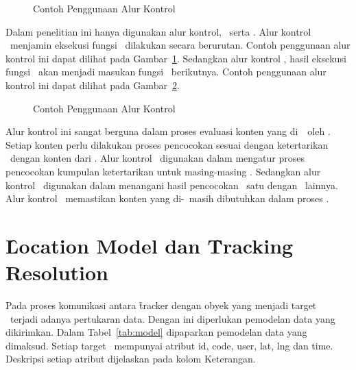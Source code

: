 \noindent
\begin{figure}
	\centering
	\lstset{basicstyle=\footnotesize\ttfamily,frame=single,language=javascript}
	
	\caption{Contoh Penggunaan Alur Kontrol \series}
\label{fig:async_series}
\end{figure}

Dalam penelitian ini hanya digunakan alur kontrol, \series~serta \waterfall.
Alur kontrol \series~menjamin eksekusi fungsi \anonymous~dilakukan secara
berurutan. Contoh penggunaan alur kontrol ini dapat dilihat pada
Gambar~\ref{fig:async_series}. Sedangkan alur kontrol \waterfall, hasil eksekusi
fungsi \anonymous~akan menjadi masukan fungsi \anonymous~berikutnya. Contoh
penggunaan alur kontrol ini dapat dilihat pada Gambar~\ref{fig:async_waterfall}.

\noindent
\begin{figure}
	\centering
	\lstset{basicstyle=\footnotesize\ttfamily,frame=single,language=javascript}
	
	\caption{Contoh Penggunaan Alur Kontrol \waterfall}
\label{fig:async_waterfall}
\end{figure}

Alur kontrol ini sangat berguna dalam proses evaluasi konten yang
di~\publish~oleh \publisher. Setiap konten perlu dilakukan proses pencocokan
sesuai dengan ketertarikan \subscriber~dengan konten dari \publisher. Alur
kontrol \series~digunakan dalam mengatur proses pencocokan kumpulan ketertarikan
untuk masing-masing \subscriber. Sedangkan alur kontrol \waterfall~digunakan
dalam menangani hasil pencocokan \subscriber~satu dengan \subscriber~lainnya.
Alur kontrol \waterfall~memastikan konten yang di-\publish~masih dibutuhkan
dalam proses \tracking.




\section{\f{Location Model} dan \f{Tracking Resolution}}

Pada proses komunikasi antara \f{tracker} dengan obyek yang menjadi target
\tracking~terjadi adanya pertukaran data. Dengan ini diperlukan pemodelan data
yang dikirimkan. Dalam Tabel~\ref{tab:model} dipaparkan pemodelan data yang
dimaksud. Setiap target \tracking~mempunyai atribut id, code, user, lat, lng
dan time. Deskripsi setiap atribut dijelaskan pada kolom Keterangan.

